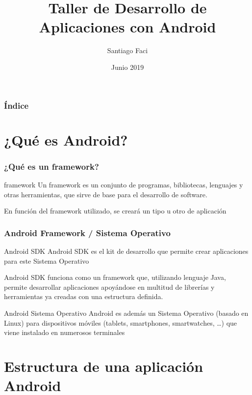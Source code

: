 \documentclass[xcolor={dvipsnames}]{beamer}
\begin{document}
\title{Taller de Desarrollo de Aplicaciones con Android}  
\author{Santiago Faci}
\date{Junio 2019} 

\begin{frame}
\titlepage
\end{frame}

\begin{frame}[plain]\frametitle{Índice}\tableofcontents
\end{frame} 


\section{¿Qué es Android?} 
\begin{frame}\frametitle{¿Qué es un framework?} 
    \begin{block}{framework}
    Un framework es un conjunto de programas, bibliotecas, lenguajes y otras herramientas, que sirve de base para el desarrollo de software.
    \end{block}
    \begin{block}{}
    En función del framework utilizado, se creará un tipo u otro de aplicación
    \end{block}
\end{frame}

\begin{frame}\frametitle{Android Framework / Sistema Operativo}
    \begin{block}{Android SDK}
    Android SDK es el kit de desarrollo que permite crear aplicaciones para este Sistema Operativo

    Android SDK funciona como un framework que, utilizando lenguaje Java, permite desarrollar aplicaciones apoyándose en multitud de librerías y
    herramientas ya creadas con una estructura definida.
    \end{block}
    \pause \begin{block}{Android Sistema Operativo}
    Android es además un Sistema Operativo (basado en Linux) para dispositivos móviles (tablets, smartphones, smartwatches, \ldots) que viene
    instalado en numerosos terminales
    \end{block}
\end{frame}

\section{Estructura de una aplicación Android} 
\end{document}
